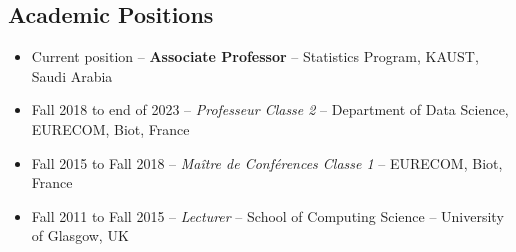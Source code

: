 \documentclass[oneside, a4paper, onecolumn, 10pt]{article}
\begin{document}
	 

\subsection*{Academic Positions}

	
                          
\begin{itemize}
\item Current position -- {\bf Associate Professor} -- %
  Statistics Program, KAUST, Saudi Arabia %

\item Fall 2018 to end of 2023 -- {\em Professeur Classe 2} -- %
  Department of Data Science, EURECOM, Biot, France %




\item Fall 2015 to Fall 2018 -- {\em Ma\^{i}tre de Conf\'{e}rences Classe 1} -- %
  EURECOM, Biot, France %

\item Fall 2011 to Fall 2015 -- {\em Lecturer} -- %
  School of Computing Science -- University of Glasgow, UK %


\end{itemize}
\end{document}
